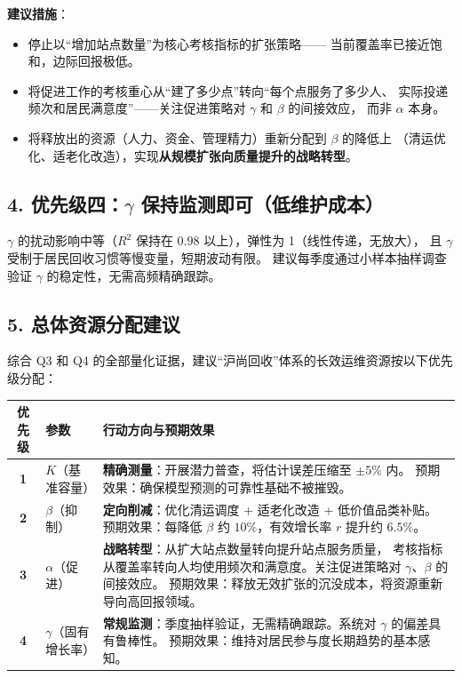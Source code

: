 \documentclass[12pt,a4paper]{article}
\begin{document}
\textbf{建议措施}：
\begin{itemize}
  \item 停止以``增加站点数量''为核心考核指标的扩张策略——
        当前覆盖率已接近饱和，边际回报极低。
  \item 将促进工作的考核重心从``建了多少点''转向``每个点服务了多少人、
        实际投递频次和居民满意度''——关注促进策略对 $\gamma$ 和 $\beta$ 的间接效应，
        而非 $\alpha$ 本身。
  \item 将释放出的资源（人力、资金、管理精力）重新分配到 $\beta$ 的降低上
        （清运优化、适老化改造），实现\textbf{从规模扩张向质量提升的战略转型}。
\end{itemize}

\subsection*{4. 优先级四：$\gamma$ 保持监测即可（低维护成本）}

$\gamma$ 的扰动影响中等（$R^2$ 保持在 $0.98$ 以上），弹性为 1（线性传递，无放大），
且 $\gamma$ 受制于居民回收习惯等慢变量，短期波动有限。
建议每季度通过小样本抽样调查验证 $\gamma$ 的稳定性，无需高频精确跟踪。

\subsection*{5. 总体资源分配建议}

综合 Q3 和 Q4 的全部量化证据，建议``沪尚回收''体系的长效运维资源按以下优先级分配：

\begin{center}
\begin{tabular}{clp{7cm}}
\toprule
优先级 & 参数 & 行动方向与预期效果 \\
\midrule
\textbf{1} & $K$（基准容量） &
  \textbf{精确测量}：开展潜力普查，将估计误差压缩至 $\pm 5\%$ 内。
  预期效果：确保模型预测的可靠性基础不被摧毁。 \\

\textbf{2} & $\beta$（抑制） &
  \textbf{定向削减}：优化清运调度 + 适老化改造 + 低价值品类补贴。
  预期效果：每降低 $\beta$ 约 $10\%$，有效增长率 $r$ 提升约 $6.5\%$。 \\

\textbf{3} & $\alpha$（促进） &
  \textbf{战略转型}：从扩大站点数量转向提升站点服务质量，
  考核指标从覆盖率转向人均使用频次和满意度。关注促进策略对 $\gamma$、$\beta$ 的间接效应。
  预期效果：释放无效扩张的沉没成本，将资源重新导向高回报领域。 \\

\textbf{4} & $\gamma$（固有增长率） &
  \textbf{常规监测}：季度抽样验证，无需精确跟踪。系统对 $\gamma$ 的偏差具有鲁棒性。
  预期效果：维持对居民参与度长期趋势的基本感知。 \\
\bottomrule
\end{tabular}
\end{center}
\end{document}

